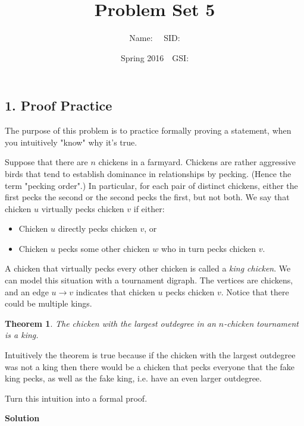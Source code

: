\documentclass{article}\usepackage{amsmath,amssymb,amsthm,tikz,tkz-graph,color,chngpage,soul,hyperref,csquotes,graphicx,floatrow}\newcommand*{\QEDB}{\hfill\ensuremath{\square}}\newtheorem*{prop}{Proposition}\renewcommand{\theenumi}{\alph{enumi}}\usepackage[shortlabels]{enumitem}\usepackage[nobreak=true]{mdframed}\usetikzlibrary{matrix,calc}\MakeOuterQuote{"}\usepackage[margin=0.75in]{geometry} \newtheorem{theorem}{Theorem}
\title{Problem Set 5}
\author{Name: $\quad$SID: }
\date{Spring 2016$\quad$GSI: }
\begin{document}
\maketitle


\subsection*{1. Proof Practice}
The purpose of this problem is to practice formally proving a statement, when you intuitively "know" why it's true.

\vspace{3mm}

\noindent Suppose that there are $n$ chickens in a farmyard. Chickens are rather aggressive birds that tend to establish dominance in relationships by pecking. (Hence the term "pecking order".) In particular, for each pair of distinct chickens, either the first pecks the second or the second pecks the first, but not both. We say that chicken $u$ virtually pecks chicken $v$ if either:
\begin{itemize}
\item Chicken $u$ directly pecks chicken $v$, or
\item Chicken $u$ pecks some other chicken $w$ who in turn pecks chicken $v$.
\end{itemize}
A chicken that virtually pecks every other chicken is called a \textit{king chicken}.
We can model this situation with a tournament digraph. The vertices are chickens, and an edge $u\to v$
indicates that chicken $u$ pecks chicken $v$. Notice that there could be multiple kings.

\begin{theorem}The chicken with the largest outdegree in an $n$-chicken tournament is a king.\end{theorem}

\noindent Intuitively the theorem is true because if the chicken with the largest outdegree was not a king then there would be a chicken that pecks everyone that the fake king pecks, as well as the fake king, i.e. have an even larger outdegree.

\vspace{3mm}

\noindent Turn this intuition into a formal proof.
\begin{mdframed}
\textbf{Solution}

\end{mdframed}
\end{document}
